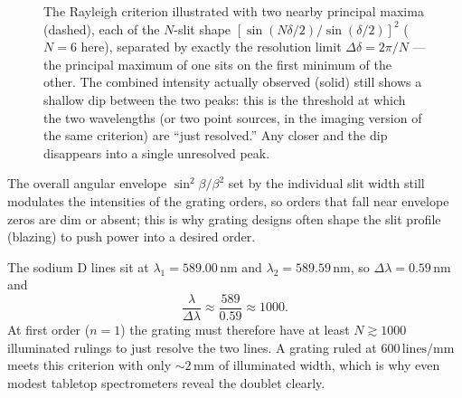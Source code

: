 \begin{figure}[ht]
\centering
{}
\caption{The Rayleigh criterion illustrated with two nearby principal maxima (dashed), each of the $N$-slit shape $[\sin(N\delta/2)/\sin(\delta/2)]^2$ ($N=6$ here), separated by exactly the resolution limit $\Delta\delta = 2\pi/N$ --- the principal maximum of one sits on the first minimum of the other. The combined intensity actually observed (solid) still shows a shallow dip between the two peaks: this is the threshold at which the two wavelengths (or two point sources, in the imaging version of the same criterion) are ``just resolved.'' Any closer and the dip disappears into a single unresolved peak.}
\label{fig:rayleigh}
\end{figure}

The overall angular envelope $\sin^2\beta/\beta^2$ set by the individual slit width still modulates the intensities of the grating orders, so orders that fall near envelope zeros are dim or absent; this is why grating designs often shape the slit profile (blazing) to push power into a desired order.

\begin{example}
The sodium D lines sit at $\lambda_1 = 589.00\,\text{nm}$ and $\lambda_2 = 589.59\,\text{nm}$, so $\Delta\lambda = 0.59\,\text{nm}$ and
\begin{equation}
    \frac{\lambda}{\Delta\lambda} \approx \frac{589}{0.59} \approx 1000.
\end{equation}
At first order ($n=1$) the grating must therefore have at least $N \gtrsim 1000$ illuminated rulings to just resolve the two lines. A grating ruled at $600\,\text{lines/mm}$ meets this criterion with only $\sim 2\,\text{mm}$ of illuminated width, which is why even modest tabletop spectrometers reveal the doublet clearly.
\end{example}

